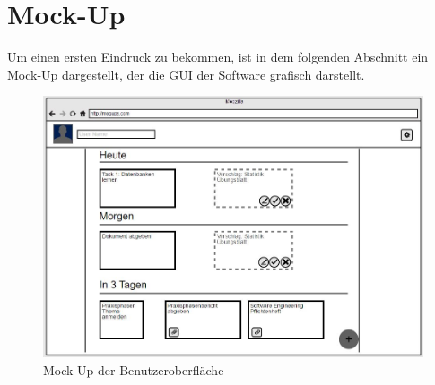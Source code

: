 
\chapter{Mock-Up}
Um einen ersten Eindruck zu bekommen, ist in dem folgenden Abschnitt ein Mock-Up dargestellt, der die GUI der Software grafisch darstellt.\\

\begin{figure}[H]
\centering
\includegraphics[scale=0.6]{images/mock-up}
\caption{Mock-Up der Benutzeroberfläche}
\end{figure}


